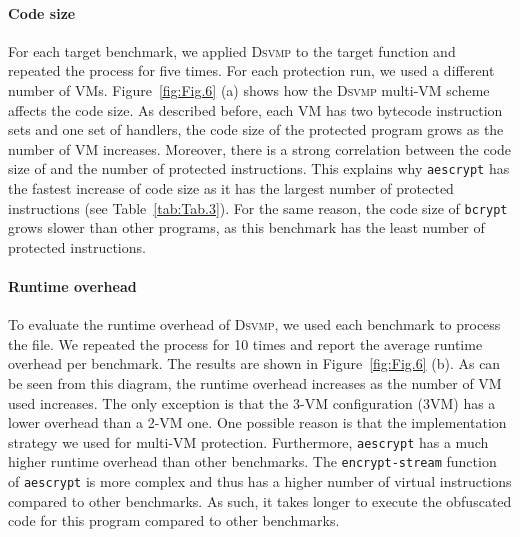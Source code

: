 \documentclass[conference]{IEEEtran}
\newcommand{\DSVMP}{\textsc{Dsvmp}\xspace}
\begin{document}
\paragraph*{Code size} For each target benchmark, we applied \DSVMP to the target function and repeated the process for five times. For each protection run, we used a different number of VMs. Figure~\ref{fig:Fig.6} (a) shows how the \DSVMP multi-VM scheme affects the code size.
 As described before, each VM has two bytecode instruction sets and one set of handlers, the code size of the protected program grows as the number of VM increases. Moreover, there is a strong correlation between the code size of and the number of protected instructions.  This explains why \texttt{aescrypt} has the fastest increase of code size as it has the largest number of protected instructions (see Table~\ref{tab:Tab.3}). For the same reason, the code size of \texttt{bcrypt} grows slower than other programs, as this benchmark has the least number of protected instructions.

\paragraph*{Runtime overhead} To evaluate the runtime overhead of \DSVMP, we used each benchmark to process the file. We repeated the process for 10 times and report the average runtime overhead per benchmark. The results are shown in Figure~\ref{fig:Fig.6} (b).
As can be seen from this diagram, the runtime overhead increases as the number of VM used increases. The only exception is that the 3-VM configuration (3VM) has a lower overhead than a 2-VM one. One possible reason is that the implementation strategy we used for multi-VM protection. 
Furthermore, \texttt{aescrypt} has a much higher runtime overhead than other benchmarks. The \texttt{encrypt-stream} function of  \texttt{aescrypt} is  more complex and thus has a higher number of virtual instructions compared to other benchmarks. As such, it takes longer to execute the obfuscated code for this program compared to other benchmarks.
\end{document}
